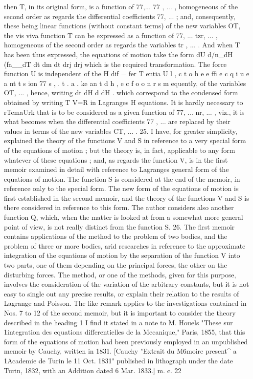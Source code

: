 \documentclass[11pt,a4paper]{book}
\begin{document}
then T, in its original form, is a function of 77,... 77 , ... , homogeneous of the second
order as regards the differential coefficients 77, ... ; and, consequently, these being linear
functions (without constant terms) of the new variables OT, the vis viva function T
can be expressed as a function of 77, ... tzr, ... , homogeneous of the second order as
regards the variables tr , ... . And when T has been thus expressed, the equations of
motion take the form
dU
d/n_dH (fa__dT
dt dm dt drj drj
which is the required transformation. The force function U is independent of the
H dif = fer T entia U l , c t o h e e ffi e c q i u e a nt t s ion 77 s , . t . a . ke an t d h , e c f o o n r s m equently, of the variables OT, ... , hence, writing
dt dH d dH
.
which correspond to the condensed form obtained by writing T V=R in Lagranges
H
equations. It is hardly necessary to rTemaUrk that is to be considered as a given
function of 77, ... nr, ... , viz., it is what becomes when the differential coefficients
77 , ... are replaced by their values in terms of the new variables CT, ... .
25. I have, for greater simplicity, explained the theory of the functions V and S
in reference to a very special form of the equations of motion ; but the theory is, in
fact, applicable to any form whatever of these equations ; and, as regards the function V,
is in the first memoir examined in detail with reference to Lagranges general form
of the equations of motion. The function S is considered at the end of the memoir,
in reference only to the special form. The new form of the equations of motion is
first established in the second memoir, and the theory of the functions V and S is
there considered in reference to this form. The author considers also another function
Q, which, when the matter is looked at from a somewhat more general point of view,
is not really distinct from the function S.
26. The first memoir contains applications of the method to the problem of two
bodies, and the problem of three or more bodies, arid researches in reference to the
approximate integration of the equations of motion by the separation of the function
V
into two parts, one of them depending on the principal forces, the other on the
disturbing forces. The method, or one of the methods, given for this purpose, involves
the consideration of the variation of the arbitrary constants, but it is not easy to
single out any precise results, or explain their relation to the results of Lagrange and
Poisson. The like remark applies to the investigations contained in Nos. 7 to 12 of
the second memoir, but it is important to consider the theory described in the heading
1 I find it stated in a note to M. Houels "These sur 1integration des equations differentielles de la
Mecanique," Paris, 1855, that this form of the equations of motion had been previously employed in an
unpublished memoir by Cauchy, written in 1831. [Cauchy "Extrait du M6moire present^ a 1Academie de
Turin le 11 Oct. 1831" published in lithograph under the date Turin, 1832, with an Addition dated
6 Mar. 1833.]
m.
c. 22
\end{document}
